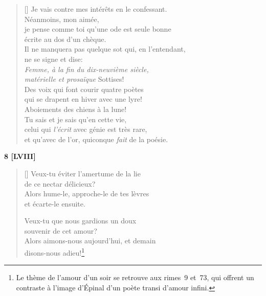 \documentclass[a4paper,12pt]{book}
\begin{document}
\begin{verse}[\versewidth]
  Je vais contre mes intérêts en le confessant. \\
  Néanmoins, mon aimée, \\
  je pense comme toi qu'une ode est seule bonne \\
  écrite au dos d'un chèque. \\
  Il ne manquera pas quelque sot qui, en l'entendant, \\
  ne se signe et dise: \\
  \emph{Femme, à la fin du dix-neuvième siècle, \\
    matérielle et prosaïque} Sottises! \\
  Des voix qui font courir quatre poètes \\
  qui se drapent en hiver avec une lyre! \\
  Aboiements des chiens à la lune! \\
  Tu sais et je sais qu'en cette vie, \\
  celui qui \emph{l'écrit} avec génie est très rare, \\
  et qu'avec de l'or, quiconque \emph{fait} de la poésie.
\end{verse}

\bigskip

\begin{center}
  \textbf{8 [LVIII]}
\end{center}

\settowidth{\versewidth}{Alors hume-le, approche-le de tes lèvres}

\begin{verse}[\versewidth]
  Veux-tu éviter l'amertume de la lie \\
  de ce nectar délicieux? \\
  Alors hume-le, approche-le de tes lèvres \\
  et écarte-le ensuite.

  Veux-tu que nous gardions un doux \\
  souvenir de cet amour? \\
  Alors aimons-nous aujourd'hui, et demain \\
  disons-nous adieu!\footnote{Le thème de l'amour d'un soir se
  retrouve aux rimes~9 et~73, qui offrent un contraste à l'image
  d'Épinal d'un poète transi d'amour infini.}
\end{verse}

\bigskip
\end{document}

